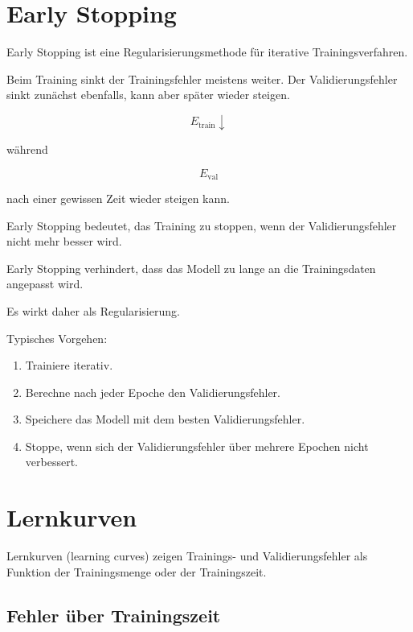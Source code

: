 \section{Early Stopping}

Early Stopping ist eine Regularisierungsmethode für iterative Trainingsverfahren.

Beim Training sinkt der Trainingsfehler meistens weiter.
Der Validierungsfehler sinkt zunächst ebenfalls, kann aber später wieder steigen.

\[
    E_{\mathrm{train}}
    \downarrow
\]

während

\[
    E_{\mathrm{val}}
\]

nach einer gewissen Zeit wieder steigen kann.

\begin{definitionbox}
Early Stopping bedeutet, das Training zu stoppen, wenn der Validierungsfehler nicht mehr besser wird.
\end{definitionbox}

\begin{conceptbox}
Early Stopping verhindert, dass das Modell zu lange an die Trainingsdaten angepasst wird.

Es wirkt daher als Regularisierung.
\end{conceptbox}

Typisches Vorgehen:

\begin{enumerate}
    \item Trainiere iterativ.
    \item Berechne nach jeder Epoche den Validierungsfehler.
    \item Speichere das Modell mit dem besten Validierungsfehler.
    \item Stoppe, wenn sich der Validierungsfehler über mehrere Epochen nicht verbessert.
\end{enumerate}

\section{Lernkurven}

Lernkurven (learning curves) zeigen Trainings- und Validierungsfehler als Funktion der Trainingsmenge oder der Trainingszeit.

\subsection{Fehler über Trainingszeit}

